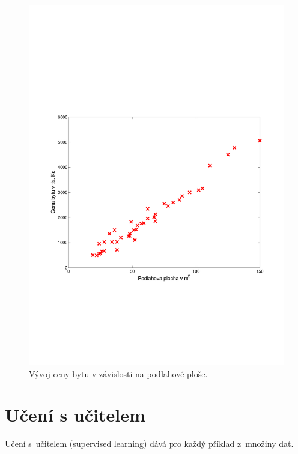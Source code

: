 \begin{figure}[!ht]
	\centering
	\includegraphics[scale = 0.5, trim = 3cm 7cm 3cm 9cm]{./Img/LinearniRegrese/cena_plocha.pdf}
	\caption{Vývoj ceny bytu v závislosti na podlahové ploše.}
	\label{fig:cena_plocha}
\end{figure}


\newpage




\section{Učení s učitelem}
\label{sec:LinearniRegreseUceniSUcitelem}

\par{Učení s~učitelem (supervised learning) dává  pro každý příklad z~množiny dat.}


